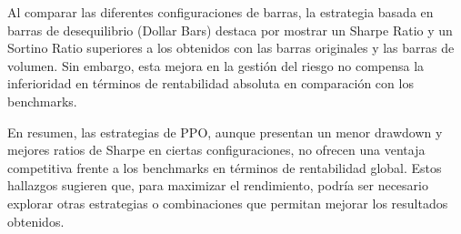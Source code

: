 \documentclass[a4paper,12pt, twoside]{report}
\begin{document}
Al comparar las diferentes configuraciones de barras, la estrategia basada en barras de desequilibrio (Dollar Bars) 
destaca por mostrar un Sharpe Ratio y un Sortino Ratio superiores a los obtenidos con las barras originales y las barras de volumen. 
Sin embargo, esta mejora en la gestión del riesgo no compensa la inferioridad en términos de rentabilidad absoluta en comparación con los benchmarks.

En resumen, las estrategias de PPO, aunque presentan un menor drawdown y mejores ratios de Sharpe en ciertas 
configuraciones, no ofrecen una ventaja competitiva frente a los benchmarks en términos de rentabilidad global. 
Estos hallazgos sugieren que, para maximizar el rendimiento, podría ser necesario explorar otras estrategias o 
combinaciones que permitan mejorar los resultados obtenidos.
\end{document}
